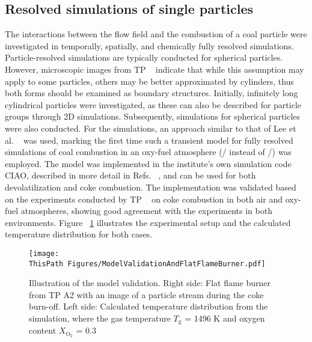 \begin{btUnit}
\subsection{Resolved simulations of single particles}
The interactions between the flow field and the combustion of a coal particle were investigated in temporally, spatially, and chemically fully resolved simulations. Particle-resolved simulations are typically conducted for spherical particles. However, microscopic images from TP ~ indicate that while this assumption may apply to some particles, others may be better approximated by cylinders, thus both forms should be examined as boundary structures. Initially, infinitely long cylindrical particles were investigated, as these can also be described for particle groups through 2D simulations. Subsequently, simulations for spherical particles were also conducted. For the simulations, an approach similar to that of Lee et al. ~\cite{Lee1996} was used, marking the first time such a transient model for fully resolved simulations of coal combustion in an oxy-fuel atmosphere (/ instead of /) was employed. The model was implemented in the institute's own simulation code CIAO, described in more detail in Refs. ~\cite{Desjardins2008, Trisjono2016}, and can be used for both devolatilization and coke combustion. The implementation was validated based on the experiments conducted by TP ~ on coke combustion in both air and oxy-fuel atmospheres, showing good agreement with the experiments in both environments. Figure ~\ref{fig:B3RFBurnerSetup} illustrates the experimental setup and the calculated temperature distribution for both cases.
\begin{figure}
	\texttt{[image: \\ThisPath Figures/ModelValidationAndFlatFlameBurner.pdf]}
	\caption{Illustration of the model validation. Right side: Flat flame burner from TP A2 with an image of a particle stream during the coke burn-off. Left side: Calculated temperature distribution from the simulation, where the gas temperature $T_\mathrm{g}$ = 1496 K and oxygen content $X_\mathrm{O_2}$ = 0.3}\label{fig:B3RFBurnerSetup}
\end{figure}
\\\\

\end{btUnit}
